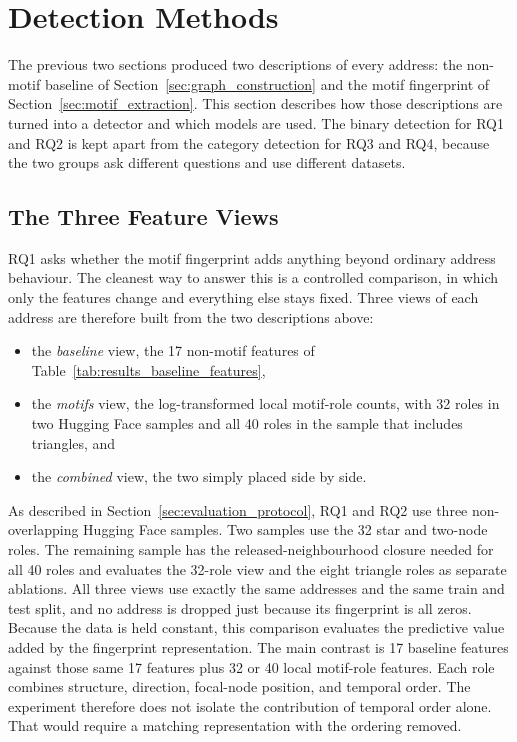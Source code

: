 \documentclass{thesisclass}
\begin{document}
\section{Detection Methods}
\label{sec:detection_methods}

The previous two sections produced two descriptions of every address: the
non-motif baseline of Section~\ref{sec:graph_construction} and the motif
fingerprint of Section~\ref{sec:motif_extraction}. This section describes how
those descriptions are turned into a detector and which models are used. The
binary detection for RQ1 and RQ2 is kept apart from the category detection for
RQ3 and RQ4, because the two groups ask different questions and use different
datasets.

\subsection{The Three Feature Views}

RQ1 asks whether the motif fingerprint adds anything beyond ordinary address
behaviour. The cleanest way to answer this is a controlled comparison, in which
only the features change and everything else stays fixed. Three views of each
address are therefore built from the two descriptions above:
\begin{itemize}
  \item the \emph{baseline} view, the 17 non-motif features of
        Table~\ref{tab:results_baseline_features},
  \item the \emph{motifs} view, the log-transformed local motif-role counts, with 32 roles
        in two Hugging Face samples and all 40 roles in the sample that includes
        triangles, and
  \item the \emph{combined} view, the two simply placed side by side.
\end{itemize}
As described in Section~\ref{sec:evaluation_protocol}, RQ1 and RQ2 use three
non-overlapping Hugging Face samples. Two samples use the 32 star and two-node
roles. The remaining sample has the released-neighbourhood closure needed for all
40 roles and evaluates the 32-role view and the eight triangle roles as separate
ablations.
All three views use exactly the same addresses and the same train and test split,
and no address is dropped just because its fingerprint is all zeros. Because the data is
held constant, this comparison evaluates the predictive value added by the
fingerprint representation. The main contrast is 17 baseline features against
those same 17 features plus 32 or 40 local motif-role features. Each role
combines structure, direction, focal-node position, and temporal order.
The experiment therefore does not isolate the contribution of temporal order
alone. That would require a matching representation with the ordering removed.
\end{document}
